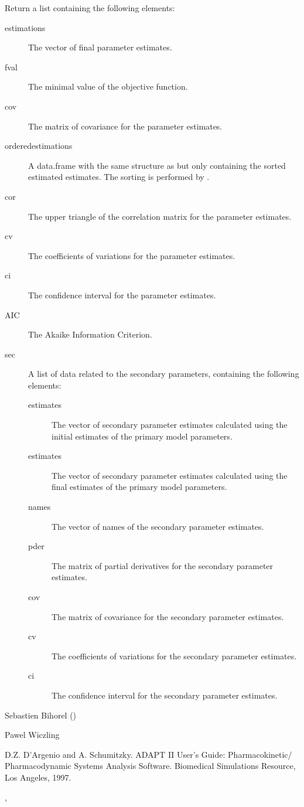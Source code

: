 %
\begin{Value}
Return a list containing the following elements:\begin{description}

\item[estimations] The vector of final parameter estimates.
\item[fval] The minimal value of the objective function.
\item[cov] The matrix of covariance for the parameter estimates.
\item[orderedestimations] A data.frame with the same structure as
 but only containing the sorted estimated estimates.
The sorting is performed by .
\item[cor] The upper triangle of the correlation matrix for the parameter
estimates.
\item[cv] The coefficients of variations for the parameter estimates.
\item[ci] The confidence interval for the parameter estimates.
\item[AIC] The Akaike Information Criterion.
\item[sec] A list of data related to the secondary parameters, containing
the following elements:\begin{description}

\item[estimates] The vector of secondary parameter estimates calculated
using the initial estimates of the primary model parameters.
\item[estimates] The vector of secondary parameter estimates calculated
using the final estimates of the primary model parameters.
\item[names] The vector of names of the secondary parameter estimates.
\item[pder] The matrix of partial derivatives for the secondary
parameter estimates.
\item[cov] The matrix of covariance for the secondary parameter
estimates.
\item[cv] The coefficients of variations for the secondary parameter
estimates.
\item[ci] The confidence interval for the secondary parameter
estimates.

\end{description}



\end{description}

\end{Value}
%
\begin{Author}\relax
Sebastien Bihorel ()

Pawel Wiczling
\end{Author}
%
\begin{References}\relax
D.Z. D'Argenio and A. Schumitzky. ADAPT II User's Guide: Pharmacokinetic/
Pharmacodynamic Systems Analysis Software. Biomedical Simulations Resource,
Los Angeles, 1997.
\end{References}
%
\begin{SeeAlso}\relax
{}, 
\end{SeeAlso}
